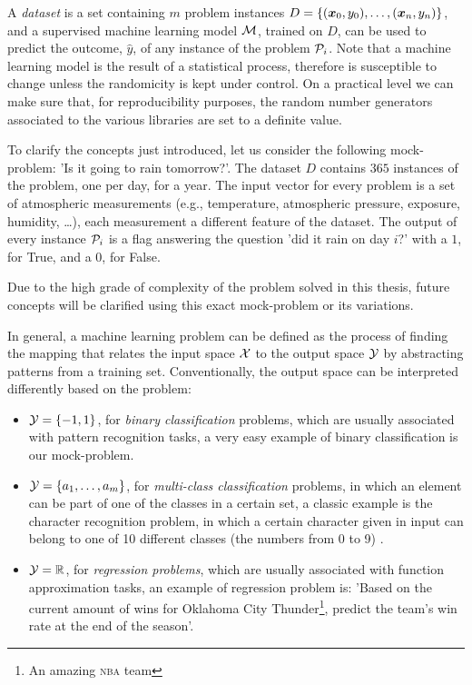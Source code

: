 A \emph{dataset} is a set containing $m$ problem instances $D = \{(\boldsymbol{x}_0, y_0), \ldots, (\boldsymbol{x}_n, y_n)\}$, and
a supervised machine learning model $\mathcal{M}$, trained on $D$, can be used to predict the outcome,
$\hat{y}$, of any instance of the problem $\mathcal{P}_i$. Note that a machine learning model is the result of a
statistical process, therefore is susceptible to change unless the randomicity is kept under control.
On a practical level we can make sure that, for reproducibility purposes, the random number
generators associated to the various libraries are set to a definite value.

\medskip

To clarify the concepts just introduced, let us consider the following mock-problem: 'Is it going to rain
tomorrow?'. The dataset $D$ contains $365$ instances of the problem, one per day, for a year. The
input vector for every problem is a set of atmospheric measurements (e.g., temperature, atmospheric
pressure, exposure, humidity, \ldots), each measurement a different feature of the dataset. The
output of every instance $\mathcal{P}_i$ is a flag answering the question 'did it rain on day $i$?'
with a $1$, for True, and a $0$, for False.

Due to the high grade of complexity of the problem solved in this thesis, future concepts will be clarified
using this exact mock-problem or its variations.

\medskip

In general, a machine learning problem can be defined as the process of finding the mapping that
relates the input space $\mathcal{X}$ to the output space $\mathcal{Y}$ by abstracting patterns from
a training set. Conventionally, the output space can be interpreted differently based on
the problem:
\begin{itemize}
	\item $\mathcal{Y} = \{-1, 1\}$, for \emph{binary classification} problems, which are usually
	      associated with pattern recognition tasks, a very easy example of binary classification is our mock-problem.
	\item $\mathcal{Y} = \{a_1,\ldots, a_m\}$, for \emph{multi-class classification} problems, in
	      which an element can be part of one of the classes in a certain set, a classic
	      example is the character recognition problem, in which a certain character given in input can belong to one of 10 different classes (the numbers from 0 to 9) \cite{pal2010handwritten}.
	\item $\mathcal{Y} = \mathbb{R}$, for \emph{regression problems}, which are usually associated
	      with function approximation tasks, an example of regression problem
	      is: 'Based on the current amount of wins for Oklahoma City Thunder\footnote{An
		      amazing \textsc{nba} team}, predict the team's win rate at the end of the season'.
\end{itemize}

